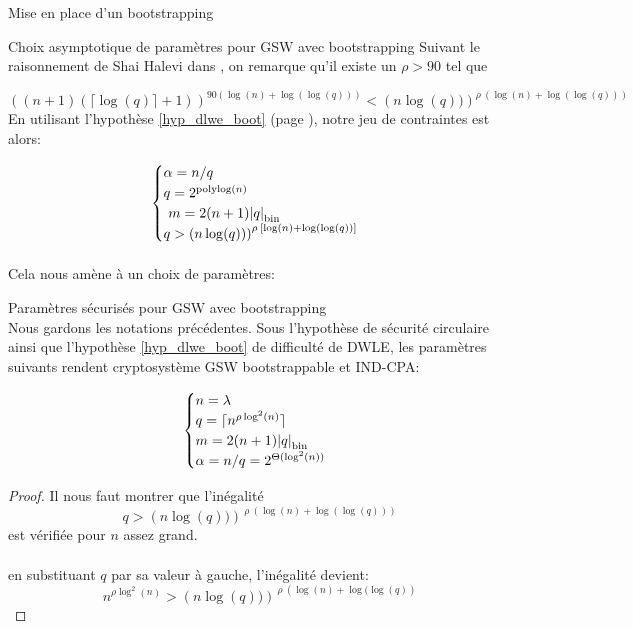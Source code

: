 \begin{section}{Mise en place d'un bootstrapping}
\begin{subsection}{Choix asymptotique de paramètres pour GSW avec bootstrapping}
Suivant le raisonnement de Shai Halevi dans \cite{halevi}, on remarque 
qu'il existe un $\rho > 90$ tel que 

\begin{equation*}
{\left((n+1)(\lceil \log(q) \rceil + 1 )\right)}^{90 \left(\log(n) +
\log(\log(q))\right)} < 
{\left(n\log(q))\right)}^{\rho\:\left(\log(n) + \log(\log(q))\right)}
\end{equation*}
En utilisant l'hypothèse  \ref{hyp_dlwe_boot} (page \pageref{hyp_dlwe_boot}), notre jeu de contraintes est alors:

\[ \begin{cases}
\alpha  = n /q \\
	q = 2^\text{polylog$(n)$}\\ 
	m = 2(n+1) \bnorm{q} \\  
	q > {\left(n\log(q))\right)}^{\rho\: \left[\log(n) + \log(\log(q))\right]}
	\end{cases} \]

\paragraph{}
Cela nous amène à un choix de paramètres:
\begin{thm}{Paramètres sécurisés pour GSW avec bootstrapping} \\
Nous gardons les notations précédentes.
Sous l'hypothèse de sécurité circulaire ainsi que l'hypothèse \ref{hyp_dlwe_boot} de difficulté de DWLE, les paramètres
suivants rendent cryptosystème GSW bootstrappable et IND-CPA:

\[ \begin{cases}
 	n = \lambda \\
	q = \lceil n^{\rho \log^2(n)}\rceil \\
	m = 2(n+1) \bnorm{q} \\  
	\alpha = n/q = 2^{\Theta(\log^2(n))}
	\end{cases} \]
\end{thm}
\begin{proof}
Il nous faut montrer que l'inégalité 
	\[ q > {\left(n\log(q))\right)}^{\:\rho\:\left(\log(n) + \log(\log(q))\right)} \]
est vérifiée pour $n$ assez grand.

\paragraph{}
en substituant $q$ par sa valeur à gauche, l'inégalité devient:
\begin{equation*} n^{\rho \log^2(n)} > 
{\left(n\log(q))\right)}^{\:\rho\: \left(\log(n) + \log(\log(q)\right)}\end{equation*}


\end{proof}
\end{subsection}
\end{section}
